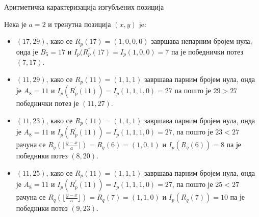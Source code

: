 \documentclass[10pt]{beamer}
\begin{document}
%		
	
	
		\begin{frame}{Аритметичка карактеризација изгубљених позиција}
		
		Нека је $ a = 2 $ и тренутна позиција $ (x, y) $ je:
		\begin{itemize}
			\item $ (17,29) $, како се $ R_{p}(17) = (1, 0, 0, 0)$ завршава непарним бројем нула, онда је $ B_{5} = 17 $ и $ I_{p}(R^{''}_{p}(17) = I_{p}(1, 0, 0) = 7 $ па је победнички потез $ (7, 17) $.
			\item $ (11, 29) $, како се $ R_{p}(11) = (1, 1, 1) $ завршава парним бројем нула, онда је $ A_{8} = 11 $ и $ I_{p}(R^{'}_{p}(11)) = I_{p}(1, 1, 1, 0) = 27 $ па пошто је $ 29 > 27 $ победнички потез је $ (11, 27) $.
			\item $ (11, 23) $, како се $ R_{p}(11) = (1, 1, 1) $ завршава парним бројем нула, онда је $ A_{8} = 11 $ и $ I_{p}(R^{'}_{p}(11)) = I_{p}(1, 1, 1, 0) = 27 $, па пошто је $ 23 < 27 $ рачуна се $ R_{q}(\lfloor \frac{y - x}{a} \rfloor) = R_{q}(6) = (1, 0, 1) $ и $ I_{p}(R_{q}(6)) = 8 $ па је победники потез $ (8, 20) $.
			\item $ (11, 25) $, како се $ R_{p}(11) = (1, 1, 1) $ завршава парним бројем нула, онда је $ A_{8} = 11 $ и $ I_{p}(R^{'}_{p}(11)) = I_{p}(1, 1, 1, 0) = 27 $, па пошто је $ 25 < 27 $ рачуна се $ R_{q}(\lfloor \frac{y - x}{a} \rfloor) = R_{q}(7) = (1, 1, 0) $ и $ I_{p}(R_{q}(7)) = 10 $ па је победники потез $ (9, 23) $.
		\end{itemize}		
	\end{frame}
	
\end{document}
